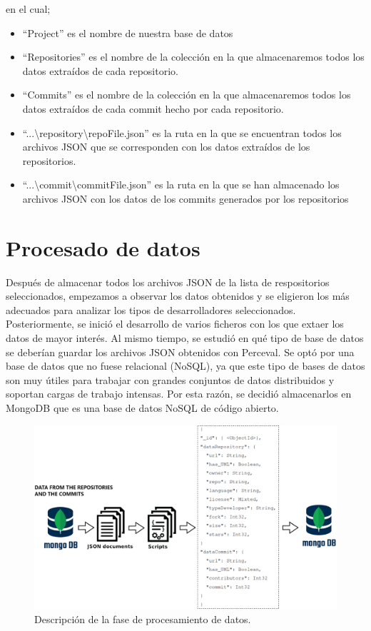 \documentclass[a4paper, 12pt]{book}
\begin{document}
en el cual;
\begin{itemize}
  \item ``Project'' es el nombre de nuestra base de datos
  \item ``Repositories'' es el nombre de la colección en la que almacenaremos todos los datos extraídos de cada repositorio.
  \item ``Commits'' es el nombre de la colección en la que almacenaremos todos los datos extraídos de cada commit hecho por cada repositorio.
  \item ``...\textbackslash repository\textbackslash repoFile.json'' es la ruta en la que se encuentran todos los archivos JSON que se corresponden con los datos extraídos de los repositorios.
  \item  ``...\textbackslash commit\textbackslash commitFile.json'' es la ruta en la que se han almacenado los archivos JSON con los datos de los commits generados por los repositorios
\end{itemize}

\section{Procesado de datos} %
\label{sec:procesado de datos}

Después de almacenar todos los archivos JSON de la lista de respositorios seleccionados, empezamos a observar los datos obtenidos y se eligieron los más adecuados para analizar los tipos de desarrolladores seleccionados. 
Posteriormente, se inició el desarrollo de varios ficheros con los que extaer los datos de mayor interés. 
Al mismo tiempo, se estudió en qué tipo de base de datos se deberían guardar los archivos JSON obtenidos con Perceval.
Se optó por una base de datos que no fuese relacional (NoSQL), ya que este tipo de bases de datos son muy útiles para trabajar con grandes conjuntos de datos distribuidos y soportan cargas de trabajo intensas.
Por esta razón, se decidió almacenarlos en MongoDB que es una base de datos NoSQL de código abierto. 

\begin{figure}
  \centering
  \includegraphics[width=16cm, keepaspectratio]{img/procesamiento_datos.png}
  \caption{Descripción de la fase de procesamiento de datos.}\label{fig:procesamiento_datos}
\end{figure}
\end{document}
